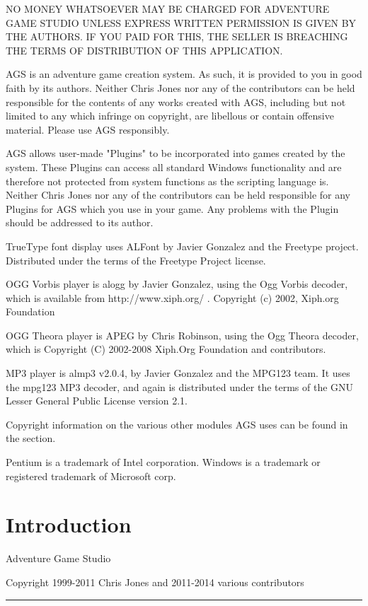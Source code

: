 NO MONEY WHATSOEVER MAY BE CHARGED FOR ADVENTURE GAME STUDIO UNLESS EXPRESS
WRITTEN PERMISSION IS GIVEN BY THE AUTHORS. IF YOU PAID FOR THIS, THE SELLER
IS BREACHING THE TERMS OF DISTRIBUTION OF THIS APPLICATION.

AGS is an adventure game creation system. As such, it is provided to you in good
faith by its authors. Neither Chris Jones nor any of the contributors can be held
responsible for the contents of any works created with AGS, including but not
limited to any which infringe on copyright, are libellous or contain offensive
material. Please use AGS responsibly.

AGS allows user-made "Plugins" to be incorporated into games created by the system.
These Plugins can access all standard Windows functionality and are therefore
not protected from system functions as the scripting language is. Neither
Chris Jones nor any of the contributors can be held responsible for any Plugins
for AGS which you use in your game. Any problems with the Plugin should be
addressed to its author.

TrueType font display uses ALFont by Javier Gonzalez and the Freetype project. Distributed
under the terms of the Freetype Project license.

OGG Vorbis player is alogg by Javier Gonzalez, using the Ogg Vorbis decoder, which is available
from http://www.xiph.org/ .  Copyright (c) 2002, Xiph.org Foundation

OGG Theora player is APEG by Chris Robinson, using the Ogg Theora decoder, which is
Copyright (C) 2002-2008 Xiph.Org Foundation and contributors.

MP3 player is almp3 v2.0.4, by Javier Gonzalez and the MPG123 team. It uses the mpg123 MP3 decoder,
and again is distributed under the terms of the GNU Lesser General Public License version 2.1.

Copyright information on the various other modules AGS uses can be found in the
 section.

Pentium is a trademark of Intel corporation.
Windows is a trademark or registered trademark of Microsoft corp.

\chapter{Introduction}%

\Large{Adventure Game Studio}

\large{Copyright 1999-2011 Chris Jones and 2011-2014 various contributors}\hrule

